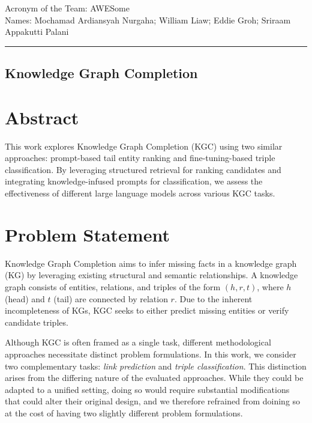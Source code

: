 \documentclass[12pt,a4paper]{article}
\begin{document}
\noindent Acronym of the Team: AWESome\\
Names: Mochamad Ardiansyah Nurgaha; William Liaw; Eddie Groh; Sriraam Appakutti Palani

    {\centering\rule{\linewidth}{.5pt}}

\begin{center}
    \section*{Knowledge Graph Completion}
\end{center}

%
%

\section{Abstract}

This work explores Knowledge Graph Completion (KGC) using two similar approaches: prompt-based tail entity ranking and fine-tuning-based triple classification.
By leveraging structured retrieval for ranking candidates and integrating knowledge-infused prompts for classification, we assess the effectiveness of different large language models across various KGC tasks.

%
%

\section{Problem Statement}\label{sec:problem-statement}

Knowledge Graph Completion aims to infer missing facts in a knowledge graph (KG) by leveraging existing structural and semantic relationships.
A knowledge graph consists of entities, relations, and triples of the form \( (h, r, t) \), where \( h \) (head) and \( t \) (tail) are connected by relation \( r \).
Due to the inherent incompleteness of KGs, KGC seeks to either predict missing entities or verify candidate triples.

Although KGC is often framed as a single task, different methodological approaches necessitate distinct problem formulations.
In this work, we consider two complementary tasks: \emph{link prediction} and \emph{triple classification}.
This distinction arises from the differing nature of the evaluated approaches.
While they could be adapted to a unified setting, doing so would require substantial modifications that could alter their original design, and we therefore refrained from doining so at the cost of having two slightly different problem formulations.
\end{document}
